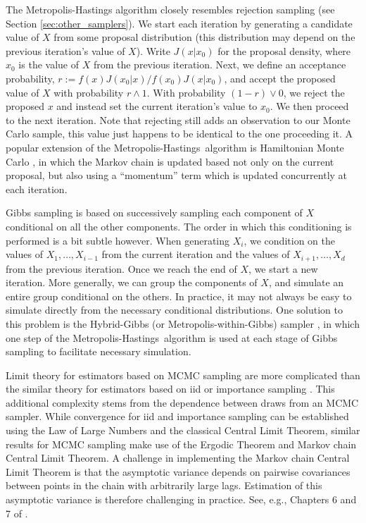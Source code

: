 \documentclass[11pt, oneside]{article}   	%
\newcommand{\mh}{Metropolis-Hastings}
\begin{document}
The Metropolis-Hastings algorithm closely resembles rejection sampling (see Section \ref{sec:other_samplers}). We start each iteration by generating a candidate value of $X$ from some proposal distribution (this distribution may depend on the previous iteration's value of $X$). Write $J(x | x_0)$ for the proposal density, where $x_0$ is the value of $X$ from the previous iteration. Next, we define an acceptance probability, $r := f(x) J(x_0 | x) / f(x_0) J(x | x_0)$, and accept the proposed value of $X$ with probability $r \wedge 1$. With probability $(1-r) \vee 0$, we reject the proposed $x$ and instead set the current iteration's value to $x_0$. We then proceed to the next iteration. Note that rejecting still adds an observation to our Monte Carlo sample, this value just happens to be identical to the one proceeding it. A popular extension of the \mh\ algorithm is Hamiltonian Monte Carlo \citep[see Section 12.4 of][]{Gel13}, in which the Markov chain is updated based not only on the current proposal, but also using a ``momentum'' term which is updated concurrently at each iteration.

Gibbs sampling is based on successively sampling each component of $X$ conditional on all the other components. The order in which this conditioning is performed is a bit subtle however. When generating $X_i$, we condition on the values of $X_1,\ldots, X_{i-1}$ from the current iteration and the values of $X_{i+1}, \ldots, X_d$ from the previous iteration. Once we reach the end of $X$, we start a new iteration.  More generally, we can group the components of $X$, and simulate an entire group conditional on the others. In practice, it may not always be easy to simulate directly from the necessary conditional distributions. One solution to this problem is the Hybrid-Gibbs (or Metropolis-within-Gibbs) sampler \citet[see Section 10.3.3 of][]{Rob04}, in which one step of the \mh\ algorithm is used at each stage of Gibbs sampling to facilitate necessary simulation.

Limit theory for estimators based on MCMC sampling are more complicated than the similar theory for estimators based on iid or importance sampling \citep{Gey91}. This additional complexity stems from the dependence between draws from an MCMC sampler. While convergence for iid and importance sampling can be established using the Law of Large Numbers and the classical Central Limit Theorem, similar results for MCMC sampling make use of the Ergodic Theorem and Markov chain Central Limit Theorem. A challenge in implementing the Markov chain Central Limit Theorem is that the asymptotic variance depends on pairwise covariances between points in the chain with arbitrarily large lags. Estimation of this asymptotic variance is therefore challenging in practice. See, e.g., Chapters 6 and 7 of \citet{Rob04}.
\end{document}
